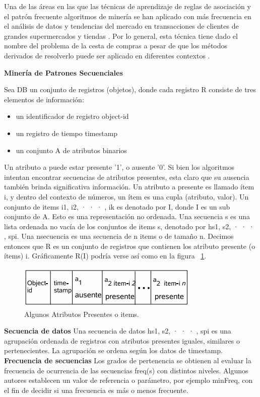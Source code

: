 Una de las áreas en las que las técnicas de aprendizaje de reglas de asociación y el patrón frecuente 
algoritmos de minería se han aplicado con más frecuencia en el análisis de datos y tendencias del
mercado en transacciones de clientes de grandes supermercados y tiendas \cite{agrawal1994fast}. Por lo general, esta técnica 
tiene dado el nombre del problema de la cesta de compras a pesar de que los métodos derivados de resolverlo
puede ser aplicado en diferentes contextos \cite{han2006data}.

\textbf{Minería de Patrones Secuenciales}

Sea DB un conjunto de registros (objetos), donde cada registro R consiste de tres
elementos de información:
\begin{itemize}
\item un identificador de registro object-id
\item un registro de tiempo timestamp
\item un conjunto A de atributos binarios
\end{itemize}
Un atributo a puede estar presente ’1’, o ausente ’0’. Si bien los algoritmos intentan encontrar secuencias de atributos
presentes, esta claro que su ausencia también brinda significativa información. Un atributo a presente es llamado
ítem i, y dentro del contexto de números, un ítem es una cupla (atributo, valor). Un conjunto de items
{i1, i2, · · · , ik} es denotado por I, donde I es un sub conjunto de A. Esto es una representación no ordenada. Una
secuencia s es una lista ordenada no vacía de los conjuntos de items s, denotado por hs1, s2, · · · , spi. Una nsecuencia
es una secuencia de n items o de tamaño n. Decimos entonces que R es un conjunto de registros que
contienen los atributo presente (o ítems) i. Gráficamente R(I) podría verse así como en la figura ~\ref{fig:atrib}.

\begin{figure}[htb]
  \centering 
  \includegraphics[scale=0.5]{pictures/atrib.png}
  \caption{Algunos Atributos Presentes o items.} 
  \label{fig:atrib}
\end{figure}

\textbf{Secuencia de datos} Una secuencia de datos hs1, s2, · · · , spi es una agrupación
ordenada de registros con atributos presentes iguales, similares o pertenecientes. La agrupación se ordena según los
datos de timestamp. \\
\textbf{Frecuencia de secuencias} Los grados de pertenencia se obtienen al evaluar la frecuencia
de ocurrencia de las secuencias freq(s) con distintos niveles. Algunos autores establecen un valor
de referencia o parámetro, por ejemplo minFreq, con el fin de decidir si una frecuencia es más o menos frecuente.\\

